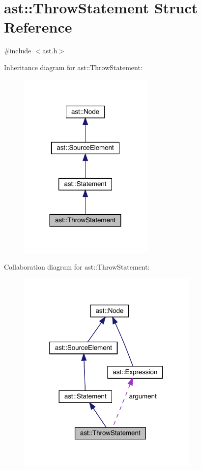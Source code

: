 \hypertarget{structast_1_1_throw_statement}{}\section{ast\+:\+:Throw\+Statement Struct Reference}
\label{structast_1_1_throw_statement}


{\ttfamily \#include $<$ast.\+h$>$}



Inheritance diagram for ast\+:\+:Throw\+Statement\+:\nopagebreak
\begin{figure}[H]
\begin{center}
\leavevmode
\includegraphics[width=188pt]{structast_1_1_throw_statement__inherit__graph}
\end{center}
\end{figure}


Collaboration diagram for ast\+:\+:Throw\+Statement\+:\nopagebreak
\begin{figure}[H]
\begin{center}
\leavevmode
\includegraphics[width=253pt]{structast_1_1_throw_statement__coll__graph}
\end{center}
\end{figure}
